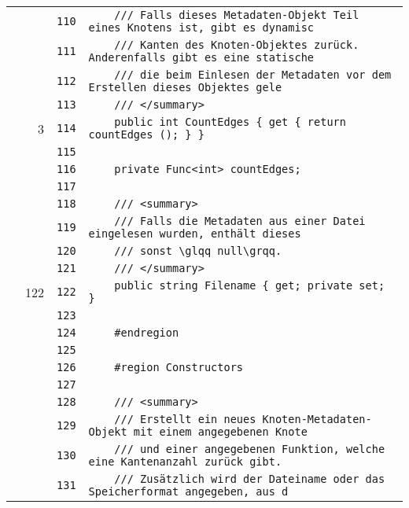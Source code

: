 \documentclass[a4paper,10pt]{article}
\begin{document}
\begin{longtable}[l]{lrrl}
\cellcolor{gray} &  & \verb~110~ & \verb~    /// Falls dieses Metadaten-Objekt Teil eines Knotens ist, gibt es dynamisc~\\
\cellcolor{gray} &  & \verb~111~ & \verb~    /// Kanten des Knoten-Objektes zurück. Anderenfalls gibt es eine statische~\\
\cellcolor{gray} &  & \verb~112~ & \verb~    /// die beim Einlesen der Metadaten vor dem Erstellen dieses Objektes gele~\\
\cellcolor{gray} &  & \verb~113~ & \verb~    /// </summary>~\\
\cellcolor{green} & 3 & \verb~114~ & \verb~    public int CountEdges { get { return countEdges (); } }~\\
\cellcolor{gray} &  & \verb~115~ & \verb~~\\
\cellcolor{gray} &  & \verb~116~ & \verb~    private Func<int> countEdges;~\\
\cellcolor{gray} &  & \verb~117~ & \verb~~\\
\cellcolor{gray} &  & \verb~118~ & \verb~    /// <summary>~\\
\cellcolor{gray} &  & \verb~119~ & \verb~    /// Falls die Metadaten aus einer Datei eingelesen wurden, enthält dieses ~\\
\cellcolor{gray} &  & \verb~120~ & \verb~    /// sonst \glqq null\grqq.~\\
\cellcolor{gray} &  & \verb~121~ & \verb~    /// </summary>~\\
\cellcolor{green} & 122 & \verb~122~ & \verb~    public string Filename { get; private set; }~\\
\cellcolor{gray} &  & \verb~123~ & \verb~~\\
\cellcolor{gray} &  & \verb~124~ & \verb~    #endregion~\\
\cellcolor{gray} &  & \verb~125~ & \verb~~\\
\cellcolor{gray} &  & \verb~126~ & \verb~    #region Constructors~\\
\cellcolor{gray} &  & \verb~127~ & \verb~~\\
\cellcolor{gray} &  & \verb~128~ & \verb~    /// <summary>~\\
\cellcolor{gray} &  & \verb~129~ & \verb~    /// Erstellt ein neues Knoten-Metadaten-Objekt mit einem angegebenen Knote~\\
\cellcolor{gray} &  & \verb~130~ & \verb~    /// und einer angegebenen Funktion, welche eine Kantenanzahl zurück gibt.~\\
\cellcolor{gray} &  & \verb~131~ & \verb~    /// Zusätzlich wird der Dateiname oder das Speicherformat angegeben, aus d~\\

\end{longtable}
\end{document}
